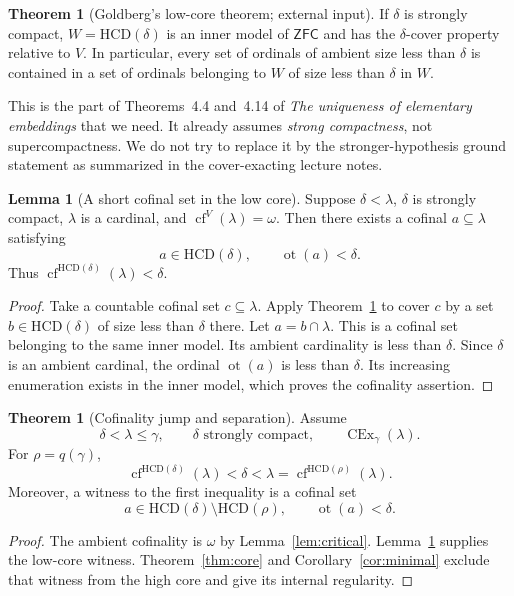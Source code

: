 \documentclass[11pt,letterpaper]{article}
\theoremstyle{definition}
\newtheorem{theorem}[definition]{Theorem}
\newtheorem{lemma}[definition]{Lemma}
\newcommand{\ZFC}{\mathsf{ZFC}}
\newcommand{\CEx}{\operatorname{CEx}}
\newcommand{\cf}{\operatorname{cf}}
\newcommand{\ot}{\operatorname{ot}}
\newcommand{\HCD}{\mathrm{HCD}}
\begin{document}
\begin{theorem}[Goldberg's low-core theorem; external input]\label{thm:goldbergcover}
If $\delta$ is strongly compact, $W=\HCD(\delta)$ is an inner model of $\ZFC$ and has the $\delta$-cover property relative to $V$. In particular, every set of ordinals of ambient size less than $\delta$ is contained in a set of ordinals belonging to $W$ of size less than $\delta$ in $W$.
\end{theorem}

This is the part of Theorems~4.4 and~4.14 of \emph{The uniqueness of elementary embeddings} that we need.\cite{uniqueness} It already assumes \emph{strong compactness}, not supercompactness. We do not try to replace it by the stronger-hypothesis ground statement as summarized in the cover-exacting lecture notes.

\begin{lemma}[A short cofinal set in the low core]\label{lem:low}
Suppose $\delta<\lambda$, $\delta$ is strongly compact, $\lambda$ is a cardinal, and $\cf^V(\lambda)=\omega$. Then there exists a cofinal $a\subseteq\lambda$ satisfying
\[
 a\in\HCD(\delta),\qquad \ot(a)<\delta.
\]
Thus $\cf^{\HCD(\delta)}(\lambda)<\delta$.
\end{lemma}

\begin{proof}
Take a countable cofinal set $c\subseteq\lambda$. Apply Theorem~\ref{thm:goldbergcover} to cover $c$ by a set $b\in\HCD(\delta)$ of size less than $\delta$ there. Let $a=b\cap\lambda$. This is a cofinal set belonging to the same inner model. Its ambient cardinality is less than $\delta$. Since $\delta$ is an ambient cardinal, the ordinal $\ot(a)$ is less than $\delta$. Its increasing enumeration exists in the inner model, which proves the cofinality assertion.
\end{proof}

\begin{theorem}[Cofinality jump and separation]\label{thm:jump}
Assume
\[
 \delta<\lambda\leq\gamma,
 \qquad \delta\text{ strongly compact},
 \qquad \CEx_\gamma(\lambda).
\]
For $\rho=q(\gamma)$,
\begin{equation}\label{eq:jump}
 \cf^{\HCD(\delta)}(\lambda)<\delta<\lambda
      =\cf^{\HCD(\rho)}(\lambda).
\end{equation}
Moreover, a witness to the first inequality is a cofinal set
\[
 a\in\HCD(\delta)\setminus\HCD(\rho),
 \qquad \ot(a)<\delta.
\]
\end{theorem}

\begin{proof}
The ambient cofinality is $\omega$ by Lemma~\ref{lem:critical}. Lemma~\ref{lem:low} supplies the low-core witness. Theorem~\ref{thm:core} and Corollary~\ref{cor:minimal} exclude that witness from the high core and give its internal regularity.
\end{proof}
\end{document}
